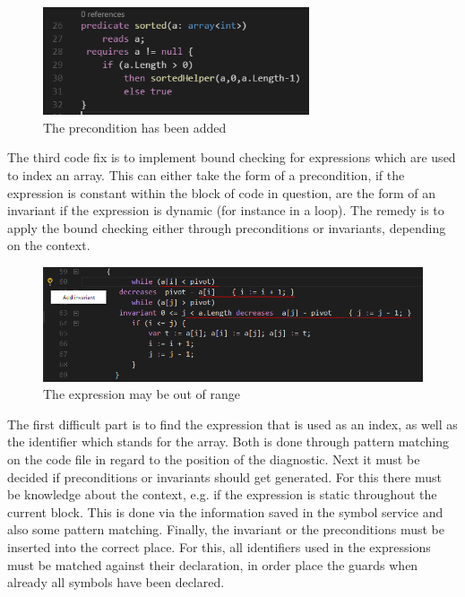   \begin{figure}[H]
	\centering
	\includegraphics[width=0.7\textwidth]{img/nullCheckApplied}
	\caption{The precondition has been added}
	\label{fig:nullcheckapplied}
\end{figure}
The third code fix is to implement bound checking for expressions which are used to index an array. This can either take the form of a precondition, if the expression is constant within the block of code in question, are the form of an invariant if the expression is dynamic (for instance in a loop).
The remedy is to apply the bound checking either through preconditions or invariants, depending on the context.
  \begin{figure}[H]
	\centering
	\includegraphics[width=1\textwidth]{img/indexOutRangeDiag}
	\caption{The expression may be out of range}
	\label{fig:indexOutOfRange}
\end{figure}
The first difficult part is to find the expression that is used as an index, as well as the identifier which stands for the array. Both is done through pattern matching on the code file in regard to the position of the diagnostic. Next it must be decided if preconditions or invariants should get generated. For this there must be knowledge about the context, e.g. if the expression is static throughout the current block. This is done via the information saved in the symbol service and also some pattern matching. \newline
Finally, the invariant or the preconditions must be inserted into the correct place. For this, all identifiers used in the expressions must be matched against their declaration, in order place the guards when already all symbols have been declared. \newline
